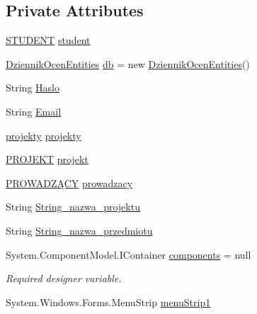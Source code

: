 \subsection*{Private Attributes}
\begin{DoxyCompactItemize}
\item 
\hyperlink{class_dziennik_ocen_1_1_s_t_u_d_e_n_t}{S\+T\+U\+D\+E\+NT} \hyperlink{class_dziennik_ocen_1_1_form_student_aaaed39105e65a3377268c2fcec6210f1}{student}
\item 
\hyperlink{class_dziennik_ocen_1_1_dziennik_ocen_entities}{Dziennik\+Ocen\+Entities} \hyperlink{class_dziennik_ocen_1_1_form_student_a3a9019b975016197789c3c90ec0efdef}{db} = new \hyperlink{class_dziennik_ocen_1_1_dziennik_ocen_entities}{Dziennik\+Ocen\+Entities}()
\item 
String \hyperlink{class_dziennik_ocen_1_1_form_student_a605a1d835840f2800e5f86171d6dbe07}{Haslo}
\item 
String \hyperlink{class_dziennik_ocen_1_1_form_student_a99d078499cfc9792c35a2e24bc379eaa}{Email}
\item 
\hyperlink{class_dziennik_ocen_1_1projekty}{projekty} \hyperlink{class_dziennik_ocen_1_1_form_student_a19d7a045f784efdea81c63cba2b7790e}{projekty}
\item 
\hyperlink{class_dziennik_ocen_1_1_p_r_o_j_e_k_t}{P\+R\+O\+J\+E\+KT} \hyperlink{class_dziennik_ocen_1_1_form_student_a07f299e38f5101c74ccc1457a8ad5140}{projekt}
\item 
\hyperlink{class_dziennik_ocen_1_1_p_r_o_w_a_d_z_xC4_x84_c_y}{P\+R\+O\+W\+A\+D\+ZĄ\+CY} \hyperlink{class_dziennik_ocen_1_1_form_student_a0c2713944091a51472ddee03e6bbf89f}{prowadzacy}
\item 
String \hyperlink{class_dziennik_ocen_1_1_form_student_adc736f606ec04500d5aa4d863f5bf5f7}{String\+\_\+nazwa\+\_\+projektu}
\item 
String \hyperlink{class_dziennik_ocen_1_1_form_student_a2702dfb84796524735a0ffe6d818fb85}{String\+\_\+nazwa\+\_\+przedmiotu}
\item 
System.\+Component\+Model.\+I\+Container \hyperlink{class_dziennik_ocen_1_1_form_student_a51980b83afbb6d6e6a8204c853243527}{components} = null
\begin{DoxyCompactList}\small\item\em Required designer variable. \end{DoxyCompactList}\item 
System.\+Windows.\+Forms.\+Menu\+Strip \hyperlink{class_dziennik_ocen_1_1_form_student_aad32af9f2db63885de87e9d52531b3ed}{menu\+Strip1}

\end{DoxyCompactItemize}
